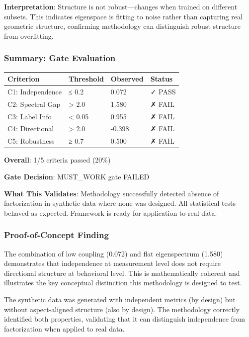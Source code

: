 \textbf{Interpretation}: Structure is not robust—changes when trained on different subsets. This indicates eigenspace is fitting to noise rather than capturing real geometric structure, confirming methodology can distinguish robust structure from overfitting.

\subsubsection{Summary: Gate Evaluation}

\begin{table}[htbp]
\centering
\begin{tabular}{llll}
\toprule
Criterion & Threshold & Observed & Status \\
\midrule
C1: Independence & ≤ 0.2 & 0.072 & ✓ PASS \\
C2: Spectral Gap & > 2.0 & 1.580 & ✗ FAIL \\
C3: Label Info & < 0.05 & 0.955 & ✗ FAIL \\
C4: Directional & > 2.0 & -0.398 & ✗ FAIL \\
C5: Robustness & ≥ 0.7 & 0.500 & ✗ FAIL \\
\bottomrule
\end{tabular}
\end{table}

\textbf{Overall}: 1/5 criteria passed (20\%)

\textbf{Gate Decision}: MUST_WORK gate FAILED

\textbf{What This Validates}: Methodology successfully detected absence of factorization in synthetic data where none was designed. All statistical tests behaved as expected. Framework is ready for application to real data.

\subsubsection{Proof-of-Concept Finding}

The combination of low coupling (0.072) and flat eigenspectrum (1.580) demonstrates that independence at measurement level does not require directional structure at behavioral level. This is mathematically coherent and illustrates the key conceptual distinction this methodology is designed to test.

The synthetic data was generated with independent metrics (by design) but without aspect-aligned structure (also by design). The methodology correctly identified both properties, validating that it can distinguish independence from factorization when applied to real data.

